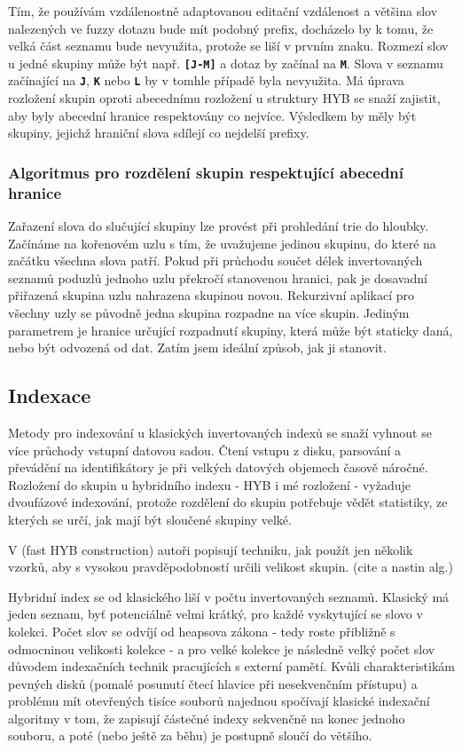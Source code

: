 \documentclass[12pt,letterpaper,oneside,openright]{book}
\newcommand{\bftt}[1]{\texttt{\textbf{#1}}}
\begin{document}
Tím, že používám vzdálenostně adaptovanou editační vzdálenost a většina slov
nalezených ve fuzzy dotazu bude mít podobný prefix, docházelo by k tomu, že
velká část seznamu bude nevyužita, protože se liší v prvním znaku. Rozmezí slov
u jedné skupiny může být např. \bftt{[J-M]} a dotaz by začínal na \bftt{M}. Slova v
seznamu začínající na \bftt{J}, \bftt{K} nebo \bftt{L} by v tomhle případě byla
nevyužita. Má úprava rozložení skupin oproti abecednímu rozložení u struktury
HYB se snaží zajistit, aby byly abecední hranice respektovány co nejvíce.
Výsledkem by měly být skupiny, jejichž hraniční slova sdílejí co nejdelší
prefixy. 

\subsubsection{Algoritmus pro rozdělení skupin respektující abecední hranice}
Zařazení slova do slučující skupiny lze provést při prohledání trie do hloubky.
Začínáme na kořenovém uzlu s tím, že uvažujeme jedinou skupinu, do které na
začátku všechna slova patří. Pokud při průchodu součet délek invertovaných
seznamů poduzlů jednoho uzlu překročí stanovenou hranici, pak je dosavadní
přiřazená skupina uzlu nahrazena skupinou novou. Rekurzivní aplikací pro
všechny uzly se původně jedna skupina rozpadne na více skupin. Jediným
parametrem je hranice určující rozpadnutí skupiny, která může být staticky
daná, nebo být odvozená od dat. Zatím jsem ideální způsob, jak ji stanovit.


\subsection{Indexace}
Metody pro indexování u klasických invertovaných indexů se snaží vyhnout se
více průchody vstupní datovou sadou. Čtení vstupu z disku, parsování a
převádění na identifikátory je při velkých datových objemech časově náročné.
Rozložení do skupin u hybridního indexu - HYB i mé rozložení - vyžaduje
dvoufázové indexování, protože rozdělení do skupin potřebuje vědět statistiky,
ze kterých se určí, jak mají být sloučené skupiny velké.

V (fast HYB construction) autoři popisují techniku, jak použít jen několik
vzorků, aby s vysokou pravděpodobností určili velikost skupin. (cite a nastin
alg.)

Hybridní index se od klasického liší v počtu invertovaných seznamů. Klasický má
jeden seznam, byť potenciálně velmi krátký, pro každé vyskytující se slovo v
kolekci. Počet slov se odvíjí od heapsova zákona - tedy roste přibližně s
odmocninou velikosti kolekce - a pro velké kolekce je následně velký počet slov
důvodem indexačních technik pracujících s externí pamětí. Kvůli
charakteristikám pevných disků (pomalé posunutí čtecí hlavice při nesekvenčním
přístupu) a problému mít otevřených tisíce souborů najednou spočívají klasické
indexační algoritmy v tom, že zapisují částečné indexy sekvenčně na konec
jednoho souboru, a poté (nebo ještě za běhu) je postupně sloučí do většího. 
\end{document}
